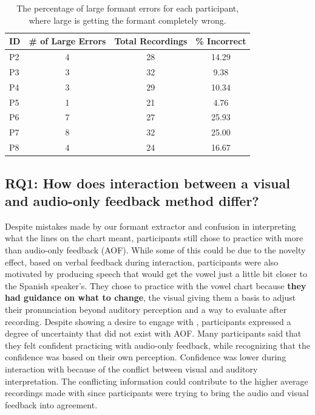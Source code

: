 \begin{table}[t]
    \centering
    \begin{tabular}{l|ccc}
        ID & \# of Large Errors & Total Recordings & \% Incorrect  \\ 
        \hline
        P2 & 4 & 28 & 14.29  \\ 
        P3 & 3 & 32 & 9.38 \\ 
        P4 & 3 & 29 & 10.34 \\ 
        P5 & 1 & 21 & 4.76 \\ 
        P6 & 7 & 27 & 25.93 \\ 
        P7 & 8 & 32 & 25.00  \\ 
        P8 & 4 & 24 & 16.67  \\ 
    \end{tabular}
    \caption{The percentage of large formant errors for each participant, where large is getting the formant completely wrong.}
    \label{tab:formantLarge}
\end{table}


\subsection{RQ1: How does interaction between a visual and audio-only feedback method differ?}
Despite mistakes made by our formant extractor and confusion in interpreting what the lines on the chart meant, participants still chose to practice with \visowel{} more than audio-only feedback (AOF). While some of this could be due to the novelty effect, based on verbal feedback during interaction, participants were also motivated by producing speech that would get the vowel just a little bit closer to the Spanish speaker's. They chose to practice with the vowel chart because \textbf{they had guidance on what to change}, the visual giving them a basis to adjust their pronunciation beyond auditory perception and a way to evaluate after recording. Despite showing a desire to engage with \visowel{}, participants expressed a degree of uncertainty that did not exist with AOF. Many participants said that they felt confident practicing with audio-only feedback, while recognizing that the confidence was based on their own perception. Confidence was lower during interaction with \visowel{} because of the conflict between visual and auditory interpretation. The conflicting information could contribute to the higher average recordings made with \visowel{} since participants were trying to bring the audio and visual feedback into agreement. 

